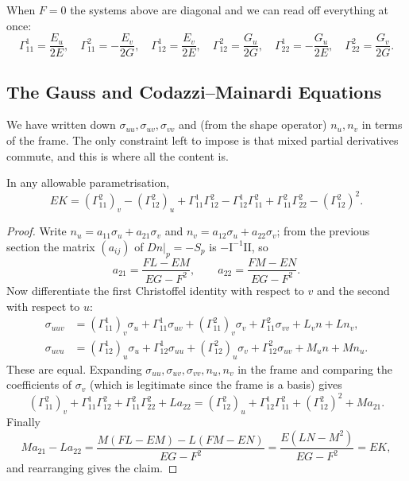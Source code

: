 \documentclass[a4paper]{scrartcl}
\begin{document}
\begin{example}
    When $F = 0$ the systems above are diagonal and we can read off everything at once:
    $$
    \Gamma^1_{11} = \frac{E_u}{2E}, \quad \Gamma^2_{11} = -\frac{E_v}{2G}, \quad \Gamma^1_{12} = \frac{E_v}{2E}, \quad \Gamma^2_{12} = \frac{G_u}{2G}, \quad \Gamma^1_{22} = -\frac{G_u}{2E}, \quad \Gamma^2_{22} = \frac{G_v}{2G}.
    $$
\end{example}

\subsection{The Gauss and Codazzi--Mainardi Equations}

We have written down $\sigma_{uu}, \sigma_{uv}, \sigma_{vv}$ and (from the shape operator) $n_u, n_v$ in terms of the frame. The only constraint left to impose is that mixed partial derivatives commute, and this is where all the content is.

\begin{theorem}
    In any allowable parametrisation,
    $$
    EK = \left(\Gamma^2_{11}\right)_v - \left(\Gamma^2_{12}\right)_u + \Gamma^1_{11}\Gamma^2_{12} - \Gamma^1_{12}\Gamma^2_{11} + \Gamma^2_{11}\Gamma^2_{22} - \left(\Gamma^2_{12}\right)^2.
    $$
\end{theorem}
\begin{proof}
    Write $n_u = a_{11}\sigma_u + a_{21}\sigma_v$ and $n_v = a_{12}\sigma_u + a_{22}\sigma_v$; from the previous section the matrix $(a_{ij})$ of $\left.Dn\right|_p = -S_p$ is $-\mathrm{I}^{-1}\mathrm{II}$, so
    $$
    a_{21} = \frac{FL - EM}{EG-F^2}, \qquad a_{22} = \frac{FM - EN}{EG-F^2}.
    $$
    Now differentiate the first Christoffel identity with respect to $v$ and the second with respect to $u$:
    \begin{align*}
        \sigma_{uuv} &= \left(\Gamma^1_{11}\right)_v \sigma_u + \Gamma^1_{11}\sigma_{uv} + \left(\Gamma^2_{11}\right)_v\sigma_v + \Gamma^2_{11}\sigma_{vv} + L_v n + L n_v, \\
        \sigma_{uvu} &= \left(\Gamma^1_{12}\right)_u \sigma_u + \Gamma^1_{12}\sigma_{uu} + \left(\Gamma^2_{12}\right)_u\sigma_v + \Gamma^2_{12}\sigma_{uv} + M_u n + M n_u.
    \end{align*}
    These are equal. Expanding $\sigma_{uu}, \sigma_{uv}, \sigma_{vv}, n_u, n_v$ in the frame and comparing the coefficients of $\sigma_v$ (which is legitimate since the frame is a basis) gives
    $$
    \left(\Gamma^2_{11}\right)_v + \Gamma^1_{11}\Gamma^2_{12} + \Gamma^2_{11}\Gamma^2_{22} + La_{22} = \left(\Gamma^2_{12}\right)_u + \Gamma^1_{12}\Gamma^2_{11} + \left(\Gamma^2_{12}\right)^2 + Ma_{21}.
    $$
    Finally
    $$
    Ma_{21} - La_{22} = \frac{M(FL-EM) - L(FM-EN)}{EG-F^2} = \frac{E(LN-M^2)}{EG-F^2} = EK,
    $$
    and rearranging gives the claim.
\end{proof}
\end{document}
